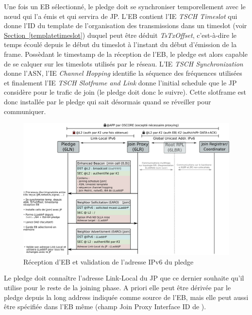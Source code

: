 \documentclass[]{report}
\newcommand{\wordlink}[2]{\hyperref[#2]{#1~\ref{#2}}}
\begin{document}
Une fois un EB sélectionné, le pledge doit se synchroniser temporellement avec le nœud qui l'a émis et qui servira de JP. L'EB contient l'IE \textit{TSCH Timeslot} qui donne l'ID du template de l'organisation des transmissions dans un timeslot (voir \wordlink{Section}{templatetimeslot}) duquel peut être déduit \textit{TsTxOffset}, c'est-à-dire le temps écoulé depuis le début du timeslot à l'instant du début d'émission de la frame. Possèdant le timestamp de la réception de l'EB, le pledge est alors capable de se calquer sur les timeslots utilisés par le réseau. L'IE \textit{TSCH Synchronization} donne l'ASN, l'IE \textit{Channel Hopping }identifie la séquence des fréquences utilisées et finalement l'IE \textit{TSCH Slotframe and Link }donne l'initial schedule que le JP considère pour le trafic de join (le pledge doit donc le suivre). Cette slotframe est donc installée par le pledge qui sait désormais quand se réveiller pour communiquer.\\

\newpage

\vspace{0.2cm}
	\begin{figure}[!h]
	\centering
	\includegraphics[width=\linewidth]{Joining_phase_part1}
	\caption{Réception d'EB et validation de l'adresse IPv6 du pledge}
	\label{fig:join_part1}
	\end{figure}
\vspace{0.2cm}

Le pledge doit connaître l'adresse Link-Local du JP que ce dernier souhaite qu'il utilise pour le reste de la joining phase. A priori elle peut être dérivée par le pledge depuis la long address indiquée comme source de l'EB, mais elle peut aussi être spécifiée dans l'EB même (champ Join Proxy Interface ID de \cite{ietf-6tisch-enrollment-enhanced-beacon-14}).\\
\end{document}

